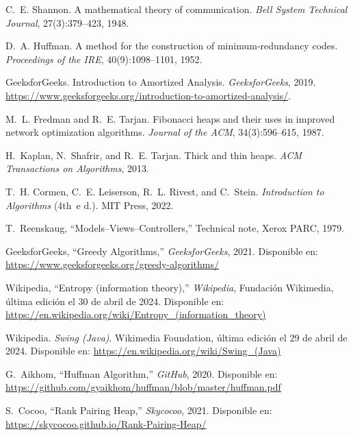 \documentclass{ieeetj}
\begin{document}

\begin{thebibliography}{9}

C.~E. Shannon.
\newblock A mathematical theory of communication.
\newblock \emph{Bell System Technical Journal}, 27(3):379–423, 1948.

D.~A. Huffman.
\newblock A method for the construction of minimum‐redundancy codes.
\newblock \emph{Proceedings of the IRE}, 40(9):1098–1101, 1952.

GeeksforGeeks.
\newblock Introduction to Amortized Analysis.
\newblock \emph{GeeksforGeeks}, 2019.
\newblock \url{https://www.geeksforgeeks.org/introduction-to-amortized-analysis/}.

M.~L. Fredman and R.~E. Tarjan.
\newblock Fibonacci heaps and their uses in improved network optimization algorithms.
\newblock \emph{Journal of the ACM}, 34(3):596–615, 1987.

H.~Kaplan, N.~Shafrir, and R.~E. Tarjan.
\newblock Thick and thin heaps.
\newblock \emph{ACM Transactions on Algorithms}, 2013.

T.~H. Cormen, C.~E. Leiserson, R.~L. Rivest, and C.~Stein.
\newblock \emph{Introduction to Algorithms} (4th~e
d.).
\newblock MIT Press, 2022.

 T.~Reenskaug, ``Models–Views–Controllers,'' Technical note, Xerox PARC, 1979.

 GeeksforGeeks, ``Greedy Algorithms,'' \textit{GeeksforGeeks}, 2021. Disponible en: \url{https://www.geeksforgeeks.org/greedy-algorithms/}

  Wikipedia, ``Entropy (information theory),'' \textit{Wikipedia}, Fundación Wikimedia, última edición el 30 de abril de 2024. Disponible en: \url{https://en.wikipedia.org/wiki/Entropy_(information_theory)}

Wikipedia.
\newblock \emph{Swing (Java)}.
\newblock Wikimedia Foundation, última edición el 29 de abril de 2024.
\newblock Disponible en: \url{https://en.wikipedia.org/wiki/Swing_(Java)}


 G.~Aikhom, ``Huffman Algorithm,'' \textit{GitHub}, 2020. Disponible en: \url{https://github.com/gyaikhom/huffman/blob/master/huffman.pdf}

 S.~Cocoo, ``Rank Pairing Heap,'' \textit{Skycocoo}, 2021. Disponible en: \url{https://skycocoo.github.io/Rank-Pairing-Heap/}


\end{thebibliography}
\end{document}
